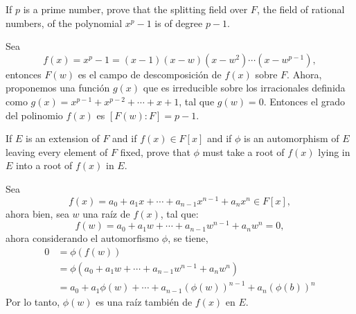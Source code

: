 \begin{problema}[Problema 7]
    If $p$ is a prime number, prove that the splitting field over $F$, the field of rational numbers, of the polynomial $x^p-1$ is of degree $p-1$.
    \begin{dem}
        Sea
        $$f(x)=x^p-1=(x-1)(x-w)(x-w^2)\cdots(x-w^{p-1}),$$
        entonces $F(w)$ es el campo de descomposición de $f(x)$ sobre $F$. Ahora, proponemos una función $g(x)$ que es irreducible sobre los irracionales definida como $g(x)=x^{p-1}+x^{p-2}+\cdots +x+1$, tal que $g(w)=0$. Entonces el grado del polinomio $f(x)$ es $[F(w):F]=p-1$.
    \end{dem}
\end{problema}

\begin{problema}[Problema 11]
    If $E$ is an extension of $F$ and if $f(x) \in F[x]$ and if $\phi$ is an automorphism of $E$ leaving every element of $F$ fixed, prove that $\phi$ must take a root of $f(x)$ lying in $E$ into a root of $f(x)$ in $E$.
    \begin{dem}
        Sea 
        $$f(x)=a_0+a_1x+\cdots +a_{n-1}x^{n-1}+a_nx^n\in F[x],$$
        ahora bien, sea $w$ una raíz de $f(x)$, tal que: 
        $$f(w)=a_0+a_1w+\cdots +a_{n-1}w^{n-1}+a_nw^n=0,$$
        ahora considerando el automorfismo $\phi$, se tiene, 
        \begin{align*}
            0 &= \phi\left(f(w)\right)\\
              &= \phi\left(a_0+a_1w+\cdots +a_{n-1}w^{n-1}+a_nw^n\right)\\
              &= a_0+a_1\phi(w)+\cdots + a_{n-1}(\phi(w))^{n-1}+a_n(\phi(b))^n
        \end{align*}
        Por lo tanto, $\phi(w)$ es una raíz también de $f(x)$ en $E$. 
    \end{dem}
\end{problema}

